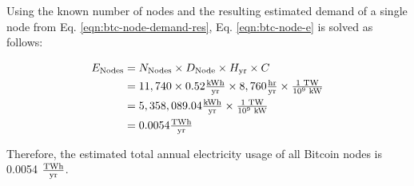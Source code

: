 Using the known number of nodes and the resulting estimated demand of a single node from Eq. \eqref{eqn:btc-node-demand-res}, Eq. \eqref{eqn:btc-node-e} is solved as follows:

\begin{align}\label{eqn:btc-node-e-res}
  E_\textrm{Nodes} &= N_\textrm{Nodes} \times D_\textrm{Node} \times H_\textrm{yr} \times C \nonumber \\
                   &= 11,740 \times 0.52 \tfrac{ \textrm{kWh} } { \textrm{yr} } \times 8,760 \tfrac{ \textrm{hr} } { \textrm{yr} } \times \tfrac{1 \textrm{ TW} } { 10^9 \textrm{ kW}} \nonumber \\
                   &=  5,358,089.04 \tfrac{ \textrm{kWh} } { \textrm{yr} } \times \tfrac{1 \textrm{ TW} } { 10^9 \textrm{ kW}} \nonumber \\
                   &=  0.0054 \tfrac{ \textrm{{T}Wh} } { \textrm{yr} }
\end{align}

Therefore, the estimated total annual electricity usage of all Bitcoin nodes is 0.0054 $\tfrac{ \textrm{{T}Wh} } { \textrm{yr} }$.
